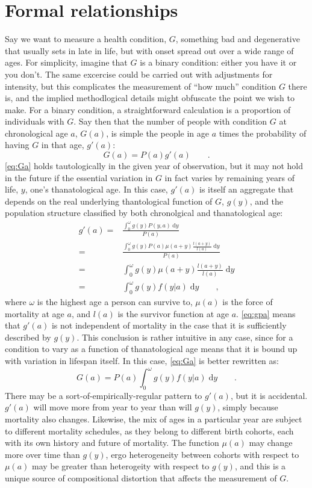 \documentclass[11pt,oneside,a4paper]{article} %
\newcommand{\dd}{\; \mathrm{d}}
\newcommand{\tc}{\quad\quad\text{,}}
\newcommand{\tp}{\quad\quad\text{.}}
\begin{document}
\section*{Formal relationships}
Say we want to measure a health condition, $G$, something bad and degenerative
that usually sets in late in life, but with onset spread out over a wide range
of ages. For simplicity, imagine that $G$ is a binary condition: either you have
it or you don't. The same excercise could be carried out with adjustments for
intensity, but this complicates the measurement of ``how much'' condition $G$
there is, and the implied methodlogical details might obfuscate the point we
wish to make. For a binary condition, a straightforward calculation is a
proportion of individuals with $G$. Say then that the number of people
with condition $G$ at chronological age $a$, $G(a)$, is simple the people in age
$a$ times the probability of having $G$ in that age, $g'(a)$:
\begin{equation}
\label{eq:Ga}
G(a) = P(a)  g'(a) \tp
\end{equation}
\eqref{eq:Ga} holds tautologically in the given year of observation, but it may
not hold in the future if the essential variation in $G$ in fact varies by
remaining years of life, $y$, one's thanatological age. In this case, $g'(a)$ is
itself an aggregate that depends on the real underlying thantological function
of $G$, $g(y)$, and the population structure classified by both chronolgical and
thanatological age:
\begin{align}
\label{eq:gpa}
g'(a) =& \frac{\int _0^\omega g(y)  P(y,a) \dd y}{P(a)} \\
  =& \frac{\int _0^\omega g(y)  P(a) \mu(a+y)\frac{l(a+y)}{l(a)}\dd y}{P(a)}\\
  =& \int _0^\omega g(y) \mu(a+y)\frac{l(a+y)}{l(a)}\dd y \\
  =& \int _0^\omega g(y) f(y|a)\dd y \tc
\end{align}
where $\omega$ is the highest age a person can survive to,
$\mu(a)$ is the force of mortality at age $a$, and $l(a)$ is the
survivor function at age $a$. \eqref{eq:gpa} means that $g'(a)$ is not
independent of mortality in the case that it is sufficiently described by
$g(y)$. This conclusion is rather intuitive in any case, since for a condition
to vary as a function of thanatological age means that it is bound up with
variation in lifespan itself. In this case, \eqref{eq:Ga} is better rewritten
as:
\begin{equation}
G(a) = P(a) \int _0^\omega g(y) f(y|a)\dd y \tp
\end{equation}
There may be a sort-of-empirically-regular pattern to $g'(a)$, but it is
accidental. $g'(a)$ will move more from year to year than will $g(y)$, simply
because mortality also changes. Likewise, the mix of ages in a
particular year are subject to different mortality schedules, as they belong to
different birth cohorts, each with its own history and future of mortality. The
function $\mu(a)$ may change more over time than $g(y)$, ergo heterogeneity
between cohorts with respect to $\mu(a)$ may be greater than heterogeity with
respect to $g(y)$, and this is a unique source of compositional distortion that
affects the measurement of $G$.
\end{document}
